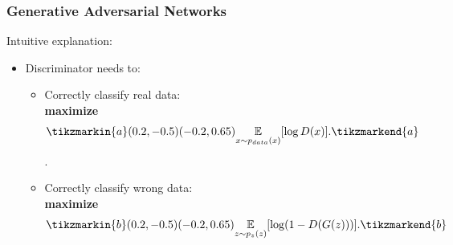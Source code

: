 \documentclass{beamer}
\begin{document}
\begin{frame}
\frametitle{Generative Adversarial Networks}
Intuitive explanation:
\begin{itemize}
	\item Discriminator needs to:
	\begin{itemize}
		\item Correctly classify real data: \\ \textbf{maximize} \begin{equation} \tikzmarkin{a}(0.2,-0.5)(-0.2,0.65) \underset{x \sim p_{data}(x)}{\mathbb{E}} [\log D(x)].\tikzmarkend{a}
		\end{equation}.
		\item Correctly classify wrong data: \\ \textbf{maximize} \begin{equation} \tikzmarkin{b}(0.2,-0.5)(-0.2,0.65)\underset{z \sim p_z(z)}{\mathbb{E}}[\log(1 - D(G(z)))].\tikzmarkend{b} \end{equation}
	\end{itemize}
\end{itemize}
\end{frame}
 
\end{document}
